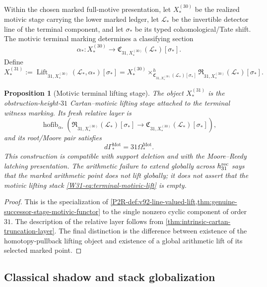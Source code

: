 \documentclass[11pt]{article}
\newtheorem{proposition}[theorem]{Proposition}
\theoremstyle{remark}
\newcommand{\Mot}{\mathrm{Mot}}
\begin{document}
Within the chosen marked full-motive presentation, let \(X_*^{(30)}\) be the
realized motivic stage carrying the lower marked ledger, let \(\mathscr L_*\)
be the invertible detector line of the terminal
component, and let \(\sigma_*\) be its typed cohomological/Tate shift.  The
motivic terminal marking determines a classifying section
\[
 \alpha_*:
 X_*^{(30)}
 \longrightarrow
 \mathfrak C_{31,X_*^{(30)}}(\mathscr L_*)[\sigma_*].
\]
Define
\begin{equation}
 \boxed{
 X_*^{(31)}
 :=
 \operatorname{Lift}_{31,X_*^{(30)}}
   (\mathscr L_*,\alpha_*)[\sigma_*]
 =
 X_*^{(30)}
 \times^h_{\mathfrak C_{31,X_*^{(30)}}(\mathscr L_*)[\sigma_*]}
 \mathfrak R_{31,X_*^{(30)}}(\mathscr L_*)[\sigma_*].}
 \label{W31-eq:terminal-motivic-lift}
\end{equation}

\begin{proposition}[Motivic terminal lifting stage]
\label{W31-prop:terminal-motivic-lift}
The object \(X_*^{(31)}\) is the obstruction-height-\(31\) Cartan--motivic
lifting stage attached to the terminal witness marking.  Its fresh relative
layer is
\[
 \operatorname{hofib}_{\alpha_*}\!\left(
 \mathfrak R_{31,X_*^{(30)}}(\mathscr L_*)[\sigma_*]
 \longrightarrow
 \mathfrak C_{31,X_*^{(30)}}(\mathscr L_*)[\sigma_*]
 \right),
\]
and its root/Moore pair satisfies
\[
 d\Gamma_*^{\Mot}=31\Omega_*^{\Mot}.
\]
This construction is compatible with support deletion and with the
Moore--Reedy latching presentation.  The arithmetic failure to extend
globally across \(h_{31}^{\rm rec}\) says that the marked arithmetic point
does not lift globally; it does not assert that the motivic lifting stack
\eqref{W31-eq:terminal-motivic-lift} is empty.
\end{proposition}

\begin{proof}
This is the specialization of
\cref{P2R-def:v92-line-valued-lift,thm:genuine-successor-stage-motivic-functor}
to the single nonzero cyclic component of order \(31\).  The description of
the relative layer follows from
\cref{thm:intrinsic-cartan-truncation-layer}.  The final distinction is the
difference between existence of the homotopy-pullback lifting object and
existence of a global arithmetic lift of its selected marked point.
\end{proof}

\subsection{Classical shadow and stack globalization}
\end{document}
